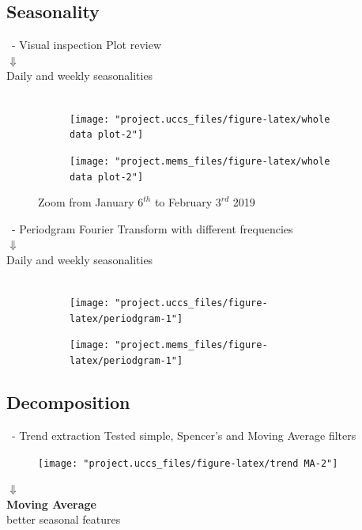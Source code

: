 \documentclass{beamer}
\begin{document}
\subsection{Seasonality}
\begin{frame}{\subsecname~- Visual inspection}
	\centering Plot review\\
	$\Downarrow$\\ %
	Daily and weekly seasonalities\\~
	\begin{figure}
		\begin{subfigure}{.45\linewidth}
			\texttt{[image: "project.uccs\_files/figure-latex/whole data plot-2"]}
		\end{subfigure}
		\begin{subfigure}{.45\linewidth}
			\texttt{[image: "project.mems\_files/figure-latex/whole data plot-2"]}
		\end{subfigure}
		\caption{Zoom from January $6^{th}$ to February $3^{rd}$ 2019}
	\end{figure}
\end{frame}

\begin{frame}{\subsecname~- Periodgram}
	\centering Fourier Transform with different frequencies\\
	$\Downarrow$\\ %
	Daily and weekly seasonalities\\~
	\begin{figure}
		\begin{subfigure}{.45\linewidth}
			\texttt{[image: "project.uccs\_files/figure-latex/periodgram-1"]}
		\end{subfigure}
		\begin{subfigure}{.45\linewidth}
			\texttt{[image: "project.mems\_files/figure-latex/periodgram-1"]}
		\end{subfigure}
	\end{figure}
\end{frame}

\subsection{Decomposition}
\begin{frame}{\subsecname~- Trend extraction}\centering
	Tested simple, Spencer's and Moving Average filters
	\begin{figure}
		\texttt{[image: "project.uccs\_files/figure-latex/trend MA-2"]}
	\end{figure}
	\large$\Downarrow$\\\normalsize\textbf{Moving Average}\\\small better seasonal features
\end{frame}
\end{document}

